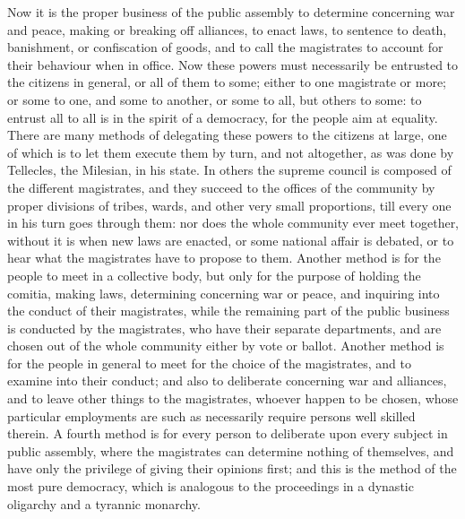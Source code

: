 Now it is the proper business of the public assembly to determine
concerning war and peace, making or breaking off alliances, to enact laws,
to sentence to death, banishment, or confiscation of goods, and to call
the magistrates to account for their behaviour when in office. Now these
powers must necessarily be entrusted to the citizens in general, or all of
them to some; either to one magistrate or more; or some to one, and some
to another, or some to all, but others to some: to entrust all to all is
in the spirit of a democracy, for the people aim at equality. There are
many methods of delegating these powers to the citizens at large, one of
which is to let them execute them by turn, and not altogether, as was done
by Tellecles, the Milesian, in his state. In others the supreme council is
composed of the different magistrates, and they succeed to the offices of
the community by proper divisions of tribes, wards, and other very small
proportions, till every one in his turn goes through them: nor does the
whole community ever meet together, without it is when new laws are
enacted, or some national affair is debated, or to hear what the
magistrates have to propose to them. Another method is for the people to
meet in a collective body, but only for the purpose of holding the
comitia, making laws, determining concerning war or peace, and inquiring
into the conduct of their magistrates, while the remaining part of the
public business is conducted by the magistrates, who have their separate
departments, and are chosen out of the whole community either by vote or
ballot. Another method is for the people in general to meet for the choice
of the magistrates, and to examine into their conduct; and also to
deliberate concerning war and alliances, and to leave other things to the
magistrates, whoever happen to be chosen, whose particular employments are
such as necessarily require persons well skilled therein. A fourth method
is for every person to deliberate upon every subject in public assembly,
where the magistrates can determine nothing of themselves, and have only
the privilege of giving their opinions first; and this is the method of
the most pure democracy, which is analogous to the proceedings in a
dynastic oligarchy and a tyrannic monarchy.


